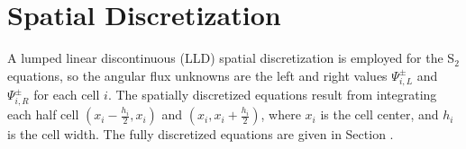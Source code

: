 \section{Spatial Discretization}

A lumped linear discontinuous (LLD) spatial discretization is employed
for the S$_2$ equations, so the angular flux
unknowns are the left and right values $\Psi_{i,L}^\pm$ and
$\Psi_{i,R}^\pm$ for each cell $i$. The spatially
discretized equations result from integrating each half cell
$(x_i-\frac{h_i}{2},x_i)$ and $(x_i,x_i+\frac{h_i}{2})$,
where $x_i$ is the cell center, and $h_i$ is the cell width.
The fully discretized equations are given in Section .

